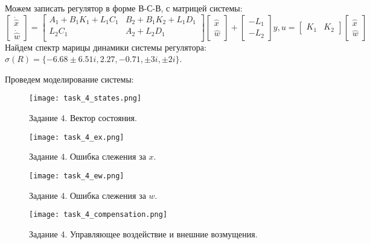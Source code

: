 Можем записать регулятор в форме В-С-В, с матрицей системы:
\begin{equation}
    \begin{bmatrix}
        \dot{\hat{x}} \\ \dot{\hat{w}}
    \end{bmatrix} =
    \begin{bmatrix}
        A_1 + B_1K_1 + L_1C_1 & B_2 + B_1K_2 + L_1D_1 \\
        L_2C_1 & A_2 + L_2D_1 \\
    \end{bmatrix}
    \begin{bmatrix}
        {\hat{x}} \\ {\hat{w}}
    \end{bmatrix} +
    \begin{bmatrix}
        -L_1 \\ -L_2 
    \end{bmatrix}y, u = \begin{bmatrix}
        K_1 & K_2 
    \end{bmatrix}\begin{bmatrix}
        {\hat{x}} \\ {\hat{w}} 
    \end{bmatrix}
\end{equation}
Найдем спектр марицы динамики системы регулятора: $\sigma(R)=\{-6.68\pm 6.51i, 2.27, -0.71, \pm 3i, \pm 2i\}$.

Проведем моделирование системы:
\begin{figure}[h]
    \centering
    \texttt{[image: task\_4\_states.png]}
    \caption{\label{fig:task4_3_2}Задание 4. Вектор состояния.}
\end{figure}
\begin{figure}[]
    \centering
    \texttt{[image: task\_4\_ex.png]}
    \caption{\label{fig:task4_3_2}Задание 4. Ошибка слежения за $x$.}
\end{figure}
\begin{figure}[]
    \centering
    \texttt{[image: task\_4\_ew.png]}
    \caption{\label{fig:task4_3_2}Задание 4. Ошибка слежения за $w$.}
\end{figure}

\begin{figure}[]
    \centering
    \texttt{[image: task\_4\_compensation.png]}
    \caption{\label{fig:task4_3_2}Задание 4. Управляющее воздействие и внешние возмущения.}
\end{figure}

